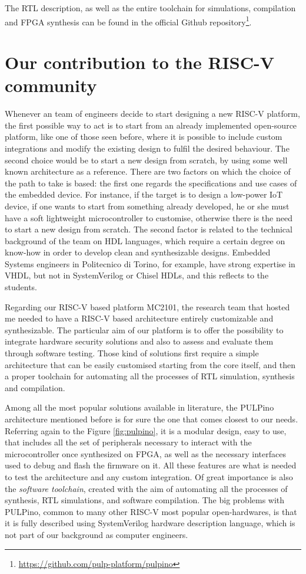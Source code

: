 The RTL description, as well as the entire toolchain for simulations, compilation and FPGA synthesis can be found in the official Github repository\footnote{\url{https://github.com/pulp-platform/pulpino}}.

\section{Our contribution to the RISC-V community}
Whenever an team of engineers decide to start designing a new RISC-V platform, the first possible way to act is to start from an already implemented open-source platform, like one of those seen before, where it is possible to include custom integrations and modify the existing design to fulfil the desired behaviour. The second choice would be to start a new design from scratch, by using some well known architecture as a reference. There are two factors on which the choice of the path to take is based: the first one regards the specifications and use cases of the embedded device. For instance, if the target is to design a low-power IoT device, if one wants to start from something already developed, he or she must have a soft lightweight microcontroller to customise, otherwise there is the need to start a new design from scratch. The second factor is related to the technical background of the team on HDL languages, which require a certain degree on know-how in order to develop clean and synthesizable designs. Embedded Systems engineers in Politecnico di Torino, for example, have strong expertise in VHDL, but not in SystemVerilog or Chisel HDLs, and this reflects to the students.

Regarding our RISC-V based platform MC2101, the research team that hosted me needed to have a RISC-V based architecture entirely customizable and synthesizable. The particular aim of our platform is to offer the possibility to integrate hardware security solutions and also to assess and evaluate them through software testing. Those kind of solutions first require a simple architecture that can be easily customised starting from the core itself, and then a proper toolchain for automating all the processes of RTL simulation, synthesis and compilation.

Among all the most popular solutions available in literature, the PULPino architecture mentioned before is for sure the one that comes closest to our needs. Referring again to the Figure \ref{fig:pulpino}, it is a modular design, easy to use, that includes all the set of peripherals necessary to interact with the microcontroller once synthesized on FPGA, as well as the necessary interfaces used to debug and flash the firmware on it. All these features are what is needed to test the architecture and any custom integration. Of great importance is also the \emph{software toolchain}, created with the aim of automating all the processes of synthesis, RTL simulations, and software compilation. The big problems with PULPino, common to many other RISC-V most popular open-hardwares, is that it is fully described using SystemVerilog hardware description language, which is not part of our background as computer engineers.

